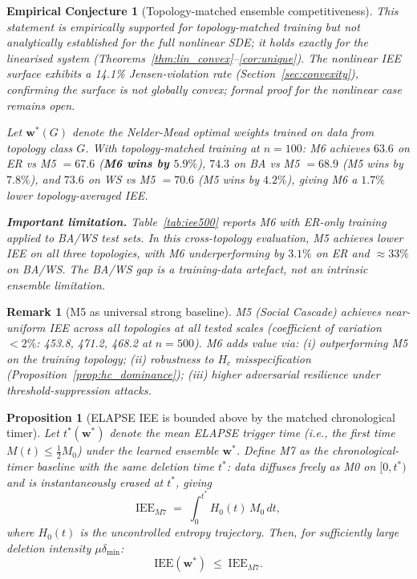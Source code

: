 \documentclass[review,12pt]{elsarticle}
\newcommand{\bfw}{\mathbf{w}}
\newcommand{\IEE}{\mathrm{IEE}}
\newcommand{\Hc}{H_c}
\newtheorem{proposition}{Proposition}
\newtheorem{conjecture}{Empirical Conjecture}
\newtheorem{remark}{Remark}
\begin{document}
\begin{conjecture}[Topology-matched ensemble competitiveness]
\label{prop:dominance}
\emph{This statement is empirically supported for topology-matched training
but not analytically established for the full nonlinear SDE; it holds exactly
for the linearised system (Theorems~\ref{thm:lin_convex}--\ref{cor:unique}).
The nonlinear IEE surface exhibits a 14.1\% Jensen-violation rate
(Section~\ref{sec:convexity}), confirming the surface is not globally
convex; formal proof for the nonlinear case remains open.}

Let $\bfw^*(G)$ denote the Nelder-Mead optimal weights \emph{trained on data
from topology class $G$}.  With topology-matched training at $n=100$:
M6 achieves $63.6$ on ER vs M5 $=67.6$ (\textbf{M6 wins by $5.9\%$}), $74.3$
on BA vs M5 $=68.9$ (M5 wins by $7.8\%$), and $73.6$ on WS vs M5 $=70.6$
(M5 wins by $4.2\%$), giving M6 a $1.7\%$ lower topology-averaged IEE.

\textbf{Important limitation.}  Table~\ref{tab:iee500} reports M6 with
\emph{ER-only} training applied to BA/WS test sets.  In this
cross-topology evaluation, M5 achieves lower IEE on all three topologies,
with M6 underperforming by $3.1\%$ on ER and $\approx 33\%$ on BA/WS.
The BA/WS gap is a training-data artefact, not an intrinsic ensemble limitation.
\end{conjecture}

\begin{remark}[M5 as universal strong baseline]
\label{rem:m5_baseline}
M5 (Social Cascade) achieves near-uniform IEE across all topologies at all
tested scales (coefficient of variation $<2\%$: 453.8, 471.2, 468.2 at $n=500$).
M6 adds value via: (i) outperforming M5 on the training topology;
(ii) robustness to $\Hc$ misspecification (Proposition~\ref{prop:hc_dominance});
(iii) higher adversarial resilience under threshold-suppression attacks.
\end{remark}

\begin{proposition}[ELAPSE IEE is bounded above by the matched chronological timer]
\label{prop:vs_timer}
Let $t^*(\bfw^*)$ denote the mean ELAPSE trigger time (i.e., the first time
$M(t) \leq \tfrac{1}{2}M_0$) under the learned ensemble $\bfw^*$.
Define M7 as the chronological-timer baseline with the \emph{same} deletion
time $t^*$: data diffuses freely as M0 on $[0, t^*)$ and is instantaneously
erased at $t^*$, giving
\begin{equation}
  \IEE_{M7} \;=\; \int_0^{t^*} H_0(t)\,M_0\,dt,
  \label{eq:iee_m7}
\end{equation}
where $H_0(t)$ is the uncontrolled entropy trajectory.
Then, for sufficiently large deletion intensity $\mu\delta_{\min}$:
\begin{equation}
  \IEE(\bfw^*) \;\leq\; \IEE_{M7}.
  \label{eq:elapse_vs_timer}
\end{equation}
\end{proposition}
\end{document}
